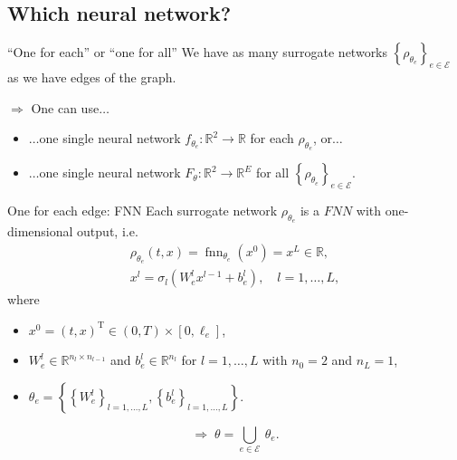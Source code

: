 \documentclass[9pt]{beamer}
\begin{document}
\subsection{Which neural network?}



\begin{frame}{“One for each” or “one for all”}
    We have as many surrogate networks $\left\{ \rho_{\theta_e} \right\}_{e \in \mathcal{E}}$ as we have edges of the graph. \\

    \vspace{5mm}

    $\Rightarrow$ One can use$\ldots$
    \begin{itemize}
        \item $\ldots$one single neural network $f_{\theta_e} \colon \mathbb{R}^2 \to \mathbb{R}$ for each $\rho_{\theta_e}$, or$\ldots$
        \item $\ldots$one single neural network $F_{\theta} \colon \mathbb{R}^2 \to \mathbb{R}^E$ for all $\left\{ \rho_{\theta_e} \right\}_{e \in \mathcal{E}}$.
    \end{itemize}
\end{frame}


\begin{frame}{One for each edge: FNN}
    Each surrogate network $\rho_{\theta_e}$ is a $FNN$ with one-dimensional output, i.e. \\ 
    \begin{equation*} 
        \begin{gathered}
            \rho_{\theta_e} \left(t, x \right) = \operatorname{fnn}_{\theta_e} \left( x^0 \right) = x^L \in \mathbb{R}, \\
            x^l = \sigma_l \left(W^l_e x^{l-1} + b^{l}_e\right), \quad l = 1, \ldots, L,
        \end{gathered} 
    \end{equation*} 
    where \\
    \begin{itemize}
        \item $x^0 = \left(t, x\right)^{\mathrm{T}} \in \left(0, T\right) \times \left[0, \ell_e\right]$,
        \item $W^l_e \in \mathbb{R}^{n_l \times n_{l-1}}$ and $b^l_e \in \mathbb{R}^{n_l}$ for $l = 1, \ldots, L$ with $n_0 = 2$ and $n_L = 1$,
        \item $\theta_e = \left\{ \left\{ W^l_e \right\}_{l = 1, \ldots, L}, \left\{ b^l_e \right\}_{l = 1, \ldots, L} \right\}$.
    \end{itemize}
    \vspace{5mm}

    \begin{equation*}
        \Rightarrow \; \theta = \bigcup_{e \in \mathcal{E}} \ \theta_e.
    \end{equation*}
    
\end{frame}
\end{document}
